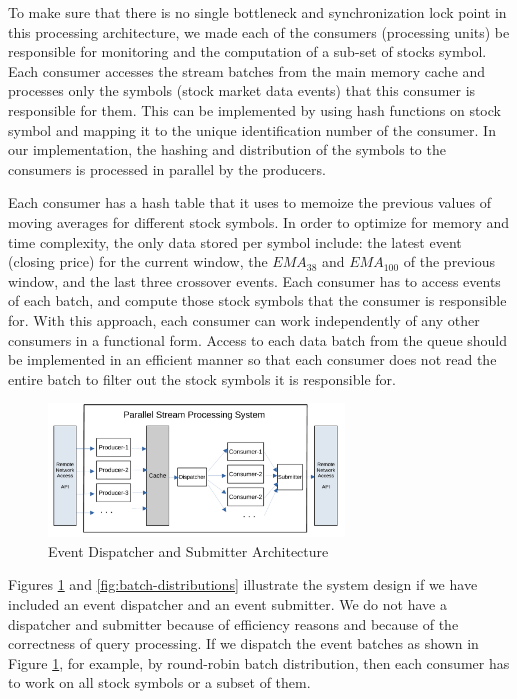 To make sure that there is no single bottleneck and synchronization lock point in this processing architecture, we made each of the consumers
(processing units) be responsible for monitoring and the computation of a sub-set of stocks symbol. Each consumer accesses the stream batches 
from the main memory cache and processes only the symbols (stock market data events) that this consumer is responsible for them. 
This can be implemented by using hash functions on stock symbol and mapping it to the unique identification number of the consumer. 
In our implementation, the hashing and distribution of the symbols to the consumers is processed in parallel by the producers.

Each consumer has a hash table that it uses to memoize the previous values of moving averages for different stock symbols. In order to optimize for memory and time complexity, the only data stored per symbol include: the latest event (closing price) for the current window, the $EMA_{38}$ and $EMA_{100}$ of the previous window, and the last three crossover events.
Each consumer has to access events of each batch, and compute those stock symbols that the consumer is responsible for. With this approach, each consumer can work independently of any other consumers in a functional form. Access to each data batch from the queue should be implemented in an efficient manner so that each consumer does not read the entire batch to filter out the stock symbols it is responsible for.

\begin{figure}[!ht]
    \begin{center}
        \includegraphics[width=0.7\textwidth]{./images/Parallel-Stream-Processing-System}
        \caption{Event Dispatcher and Submitter Architecture}
        \label{fig:parallel-srream-processing}
    \end{center}
\end{figure}


Figures \ref{fig:parallel-srream-processing} and \ref{fig:batch-distributions} illustrate the system design if we have included an event dispatcher and an event submitter. We do not have a dispatcher and submitter because of efficiency reasons and because of the correctness of query processing. If we dispatch the event batches as shown in Figure \ref{fig:parallel-srream-processing}, for example, by round-robin batch distribution, then each consumer has to work on all stock symbols or a subset of them.

